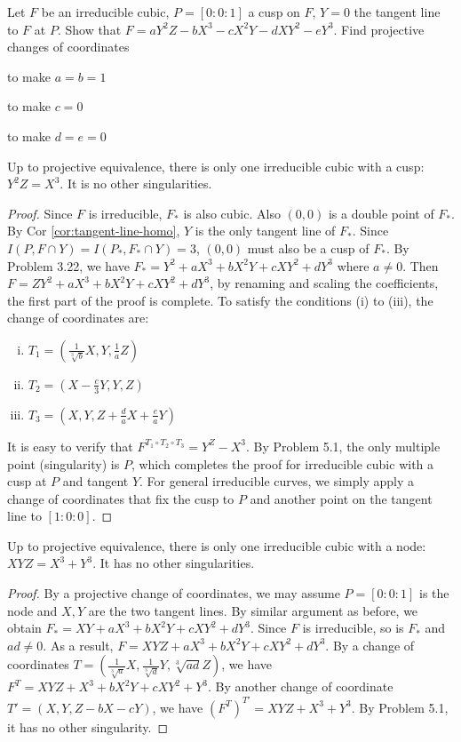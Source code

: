 \documentclass{solution}
\begin{document}
\begin{problem}{5.10}
    Let $F$ be an irreducible cubic, $P = [0:0:1]$ a cusp on $F$, $Y = 0$ the tangent line to $F$ at $P$. Show that $F = aY^2Z - bX^3 - cX^2Y - dXY^2 - eY^3$. Find projective changes of coordinates 
    \begin{inparaenum}[(i)]
        \item to make $a = b = 1$
        \item to make $c = 0$
        \item to make $d = e = 0$
    \end{inparaenum}
    Up to projective equivalence, there is only one irreducible cubic with a cusp: $Y^2Z = X^3$. It is no other singularities.
\end{problem}

\begin{proof}
    Since $F$ is irreducible, $F_*$ is also cubic. Also $(0, 0)$ is a double point of $F_*$. By Cor \ref{cor:tangent-line-homo}, $Y$ is the only tangent line of $F_*$. Since $I(P, F \cap Y) = I(P_*, F_* \cap Y) = 3$, $(0, 0)$ must also be a cusp of $F_*$. By Problem 3.22, we have $F_* = Y^2 + aX^3 + bX^2Y + cXY^2 + dY^3$ where $a \ne 0$. Then $F = ZY^2 + aX^3 + bX^2Y + cXY^2 + dY^3$, by renaming and scaling the coefficients, the first part of the proof is complete. To satisfy the conditions (i) to (iii), the change of coordinates are:
    \begin{enumerate}[(i)]
        \item $T_1 = (\frac{1}{\sqrt[3]{b}}X, Y, \frac{1}{a}Z)$
        \item $T_2 = (X - \frac{c}{3}Y, Y, Z)$
        \item $T_3 = (X, Y, Z + \frac{d}{a}X + \frac{e}{a}Y)$
    \end{enumerate}
    It is easy to verify that $F^{T_1 \circ T_2 \circ T_3} = Y^Z - X^3$. By Problem 5.1, the only multiple point (singularity) is $P$, which completes the proof for irreducible cubic with a cusp at $P$ and tangent $Y$. For general irreducible curves, we simply apply a change of coordinates that fix the cusp to $P$ and another point on the tangent line to $[1:0:0]$.
\end{proof}

\begin{problem}{5.11}
    Up to projective equivalence, there is only one irreducible cubic with a node: $XYZ = X^3 + Y^3$. It has no other singularities.
\end{problem}

\begin{proof}
    By a projective change of coordinates, we may assume $P = [0:0:1]$ is the node and $X, Y$ are the two tangent lines. By similar argument as before, we obtain $F_* = XY + aX^3 + bX^2Y + cXY^2 + dY^3$. Since $F$ is irreducible, so is $F_*$ and $ad \ne 0$. As a result, $F = XYZ + aX^3 + bX^2Y + cXY^2 + dY^3$. By a change of coordinates $T = (\frac{1}{\sqrt[3]{a}}X, \frac{1}{\sqrt[3]{d}}Y, \sqrt[3]{ad} Z)$, we have $F^T = XYZ + X^3 + bX^2Y + cXY^2 + Y^3$. By another change of coordinate $T' = (X, Y, Z - bX - cY)$, we have $(F^{T})^{T'} = XYZ + X^3 + Y^3$. By Problem 5.1, it has no other singularity.
\end{proof}
\end{document}
